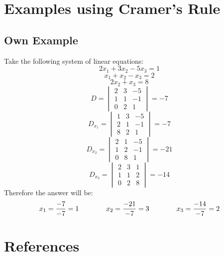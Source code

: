 \documentclass{article}
\theoremstyle{plain}
\begin{document}
\section*{Examples using Cramer's Rule}
\subsection*{Own Example}
Take the following system of linear equations:
\[2x_1 + 3x_2 - 5x_3 = 1\]
\[x_1 + x_2 - x_3 = 2\]
\[2x_2 + x_3 = 8\]
\[D = \begin{vmatrix}
2 & 3 & -5\\
1 & 1 & -1\\
0 & 2 & 1
\end{vmatrix} = -7\]
\[D_{x_1} = \begin{vmatrix}
1 & 3 & -5\\
2 & 1 & -1\\
8 & 2 & 1
\end{vmatrix} = -7\]
\[D_{x_2} = \begin{vmatrix}
2 & 1 & -5\\
1 & 2 & -1\\
0 & 8 & 1
\end{vmatrix} = -21\]
\[D_{x_3} = \begin{vmatrix}
2 & 3 & 1\\
1 & 1 & 2\\
0 & 2 & 8
\end{vmatrix} = -14\]
Therefore the answer will be:
\[x_1 = \frac{-7}{-7} = 1\color{white}texttttttt\color{black}x_2 =\frac{-21}{-7} = 3\color{white}texttttttt\color{black}x_3 =\frac{-14}{-7} = 2\]
\newpage
\section*{References}
\hangindent 

\newpage
\end{document}
